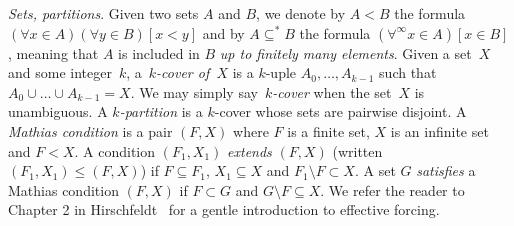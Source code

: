 \emph{Sets, partitions}.
Given two sets $A$ and $B$, we denote by $A < B$ the formula
$(\forall x \in A)(\forall y \in B)[x < y]$
and by $A \subseteq^{*} B$ the formula $(\forall^{\infty} x \in A)[x \in B]$,
meaning that $A$ is included in $B$ \emph{up to finitely many elements}.
Given a set~$X$ and some integer~$k$, a~\emph{$k$-cover of~$X$}
is a $k$-uple $A_0, \dots, A_{k-1}$ such that~$A_0 \cup \dots \cup A_{k-1} = X$.
We may simply say~\emph{$k$-cover} when the set~$X$ is unambiguous. 
A \emph{$k$-partition} is a $k$-cover whose sets are pairwise disjoint.
A \emph{Mathias condition} is a pair $(F, X)$
where $F$ is a finite set, $X$ is an infinite set
and $F < X$.
A condition $(F_1, X_1)$ \emph{extends } $(F, X)$ (written $(F_1, X_1) \leq (F, X)$)
if $F \subseteq F_1$, $X_1 \subseteq X$ and $F_1 \setminus F \subset X$.
A set $G$ \emph{satisfies} a Mathias condition $(F, X)$
if $F \subset G$ and $G \setminus F \subseteq X$.
We refer the reader to Chapter 2 in Hirschfeldt~\cite{Hirschfeldt2015Slicing} for a gentle introduction
to effective forcing.



